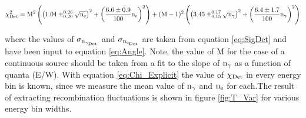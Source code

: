\begin{equation}
\footnotesize{\rm \chi_{Det}^2 = M^2\left(\left(1.04\pm_{0.20}^{0.26}\sqrt{n_e}\right)^2+\left(\frac{6.6\pm0.9}{100}n_e\right)^2\right)  +  (M-1)^2\left(\left(3.45\pm_{0.15}^{0.17}\sqrt{n_\gamma}\right)^2+\left(\frac{6.4\pm1.7}{100}n_\gamma\right)^2\right)}  \\
\label{eq:Chi_Explicit}
\end{equation}

\noindent where the values of $\rm \sigma_{n_{\gamma_{Det}}}$ and $\rm \sigma_{n_{e_{Det}}}$ are taken from equation \ref{eq:SigDet} and have been input to equation \ref{eq:Angle}. Note, the value of M for the case of a continuous source should be taken from a fit to the slope of $\rm n_\gamma$ as a function of quanta (E/W). With equation \ref{eq:Chi_Explicit} the value of $\rm \chi_{Det}$ in every energy bin is known, since we  measure the mean value of $\rm n_\gamma$ and $\rm n_e$ for each.The result of extracting recombination fluctuations is shown in figure \ref{fig:T_Var} for various energy bin widths.

